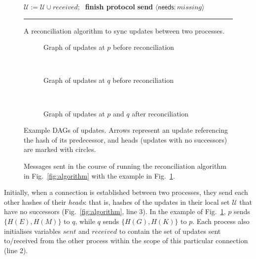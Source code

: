 \documentclass[manuscript,anonymous]{acmart}
\begin{document}
\begin{figure}[p]
\begin{minipage}{0.57\linewidth}
\begin{algorithmic}[1]
            \State $\mathcal{U} := \mathcal{U} \cup \mathit{received};\;$ \textbf{finish protocol}
        \Else
            \State \textbf{send} $\langle\mathsf{needs}: \mathit{missing}\rangle$
        \EndIf
    \EndFunction
    \end{algorithmic}
    \vspace{4pt}\hrule
    \caption{A reconciliation algorithm to sync updates between two processes.}\label{fig:algorithm}
\end{minipage}\hfill
\begin{minipage}{0.38\linewidth}
    \begin{subfigure}{\textwidth}
    
    \caption{Graph of updates at $p$ before reconciliation}
    \end{subfigure}\\[35pt]
    \begin{subfigure}{\textwidth}
    
    \caption{Graph of updates at $q$ before reconciliation}
    \end{subfigure}\\[35pt]
    \begin{subfigure}{\textwidth}
    
    \caption{Graph of updates at $p$ and $q$ after reconciliation}
    \end{subfigure}
    \caption{Example DAGs of updates. Arrows represent an update referencing the hash of its predecessor, and heads (updates with no successors) are marked with circles.}
    \label{fig:example-dags}
\end{minipage}
\end{figure}

\begin{figure}[p]
    \centering
    
    \caption{Messages sent in the course of running the reconciliation algorithm in Fig.~\ref{fig:algorithm} with the example in Fig.~\ref{fig:example-dags}.}
    \label{fig:messages}
\end{figure}

Initially, when a connection is established between two processes, they send each other hashes of their \emph{heads}: that is, hashes of the updates in their local set $\mathcal{U}$ that have no successors (Fig.~\ref{fig:algorithm}, line 3).
In the example of Fig.~\ref{fig:example-dags}, $p$ sends $\{H(E),H(M)\}$ to $q$, while $q$ sends $\{H(G),H(K)\}$ to $p$.
Each process also initialises variables $\mathit{sent}$ and $\mathit{received}$ to contain the set of updates sent to/received from the other process within the scope of this particular connection (line 2).
\end{document}
